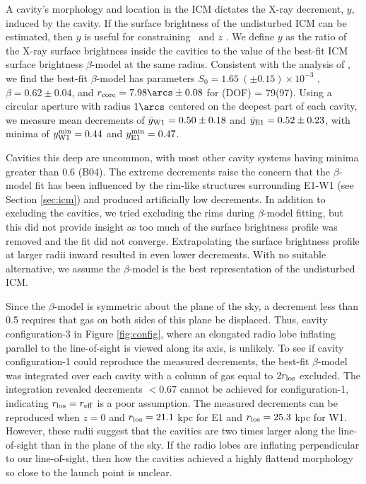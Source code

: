 \documentclass[11pt, preprint]{aastex}
\begin{document}
A cavity's morphology and location in the ICM dictates the X-ray
decrement, $y$, induced by the cavity. If the surface brightness of
the undisturbed ICM can be estimated, then $y$ is useful for
constraining \rlos\ and $z$ \citep[see][for details]{hydraa}. We
define $y$ as the ratio of the X-ray surface brightness inside the
cavities to the value of the best-fit ICM surface brightness
$\beta$-model at the same radius. Consistent with the analysis of
\citet{schindler01}, we find the best-fit $\beta$-model has parameters
$S_0 = 1.65 ~(\pm 0.15) \times 10^{-3}$ \sbr, $\beta = 0.62 \pm 0.04$,
and $r_{\rm{core}} = 7.98\arcs \pm 0.08$ for \chisq(DOF) =
79(97). Using a circular aperture with radius $1\arcs$ centered on the
deepest part of each cavity, we measure mean decrements of
$\bar{y}_{\rm{W1}} = 0.50 \pm 0.18$ and $\bar{y}_{\rm{E1}} = 0.52 \pm
0.23$, with minima of $y^{\rm{min}}_{\rm{W1}} = 0.44$ and
$y^{\rm{min}}_{\rm{E1}} = 0.47$.

Cavities this deep are uncommon, with most other cavity systems having
minima greater than 0.6 (B04). The extreme decrements raise the
concern that the $\beta$-model fit has been influenced by the rim-like
structures surrounding E1-W1 (see Section \ref{sec:icm}) and produced
artificially low decrements. In addition to excluding the cavities, we
tried excluding the rims during $\beta$-model fitting, but this did
not provide insight as too much of the surface brightness profile was
removed and the fit did not converge. Extrapolating the surface
brightness profile at larger radii inward resulted in even lower
decrements. With no suitable alternative, we assume the $\beta$-model
is the best representation of the undisturbed ICM.

Since the $\beta$-model is symmetric about the plane of the sky, a
decrement less than 0.5 requires that gas on both sides of this plane
be displaced. Thus, cavity configuration-3 in Figure \ref{fig:config},
where an elongated radio lobe inflating parallel to the line-of-sight
is viewed along its axis, is unlikely. To see if cavity
configuration-1 could reproduce the measured decrements, the best-fit
$\beta$-model was integrated over each cavity with a column of gas
equal to $2r_{\rm{los}}$ excluded. The integration revealed decrements $<
0.67$ cannot be achieved for configuration-1, indicating $r_{\rm{los}} =
r_{\rm{eff}}$ is a poor assumption. The measured decrements can be reproduced
when $z = 0$ and $r_{\rm{los}} = 21.1$ kpc for E1 and $r_{\rm{los}} = 25.3$ kpc for
W1. However, these radii suggest that the cavities are two times
larger along the line-of-sight than in the plane of the sky. If the
radio lobes are inflating perpendicular to our line-of-sight, then how
the cavities achieved a highly flattend morphology so close to the
launch point is unclear.
\end{document}
